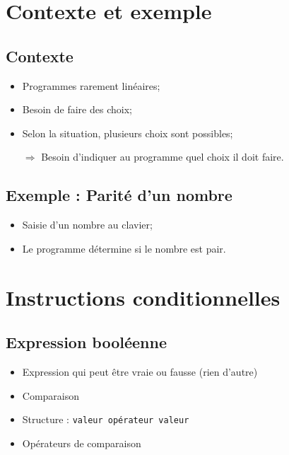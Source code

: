 \documentclass[12pt,a4paper]{article}
\date{}
\begin{document}


\section{Contexte et exemple}

	\subsection{Contexte}
	
	\begin{itemize}
		\item Programmes rarement linéaires;
		\item Besoin de faire des choix;
		\item Selon la situation, plusieurs choix sont possibles;
		\item[$\Rightarrow$] Besoin d'indiquer au programme quel choix il doit faire.
	\end{itemize}
	
	
	\subsection{Exemple : Parité d'un nombre}
	
	\begin{itemize}
		\item Saisie d'un nombre au clavier;
		\item Le programme détermine si le nombre est pair.
\end{itemize}

\section{Instructions conditionnelles}

	\subsection{Expression booléenne}
		\begin{itemize}
			\item Expression qui peut être vraie ou fausse (rien d'autre)
			\item Comparaison 
			\item Structure : \texttt{valeur opérateur valeur}
			\item Opérateurs de comparaison
		\end{itemize}
	
\end{document}
